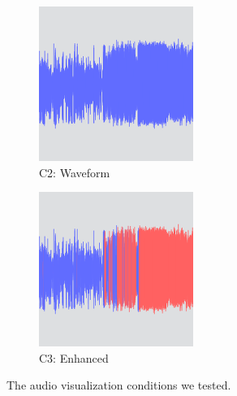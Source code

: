 \begin{figure}[t]
\begin{subfigure}{.3\textwidth}
    \includegraphics[width=\columnwidth]{figs/condition2.png}
    \caption{C2: Waveform}
  \end{subfigure}
  \begin{subfigure}{.3\textwidth}
    \centering
    \includegraphics[width=\columnwidth]{figs/condition3.png}
    \caption{C3: Enhanced}
  \end{subfigure}
  \caption{The audio visualization conditions we tested.}
  \label{fig:conditions}
\end{figure}

